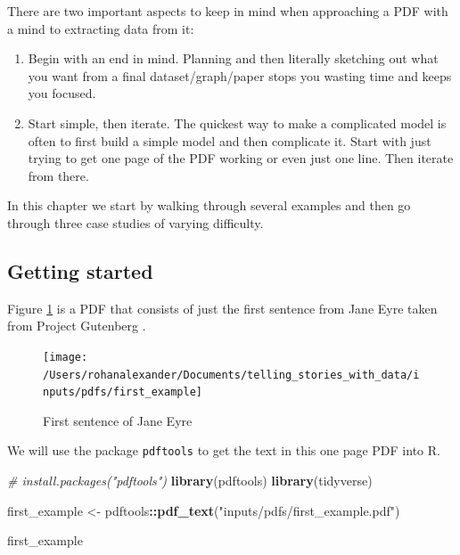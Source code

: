 \documentclass[
]{book}
\newenvironment{Shaded}{\begin{snugshade}}{\end{snugshade}}
\newcommand{\CommentTok}[1]{\textcolor[rgb]{0.56,0.35,0.01}{\textit{#1}}}
\newcommand{\KeywordTok}[1]{\textcolor[rgb]{0.13,0.29,0.53}{\textbf{#1}}}
\newcommand{\NormalTok}[1]{#1}
\newcommand{\OperatorTok}[1]{\textcolor[rgb]{0.81,0.36,0.00}{\textbf{#1}}}
\newcommand{\StringTok}[1]{\textcolor[rgb]{0.31,0.60,0.02}{#1}}
\providecommand{\tightlist}{%
  \setlength{\itemsep}{0pt}\setlength{\parskip}{0pt}}
\begin{document}
There are two important aspects to keep in mind when approaching a PDF with a mind to extracting data from it:

\begin{enumerate}
\def\labelenumi{\arabic{enumi}.}
\tightlist
\item
  Begin with an end in mind. Planning and then literally sketching out what you want from a final dataset/graph/paper stops you wasting time and keeps you focused.
\item
  Start simple, then iterate. The quickest way to make a complicated model is often to first build a simple model and then complicate it. Start with just trying to get one page of the PDF working or even just one line. Then iterate from there.
\end{enumerate}

In this chapter we start by walking through several examples and then go through three case studies of varying difficulty.

\hypertarget{getting-started-4}{%
\subsection{Getting started}\label{getting-started-4}}

Figure \ref{fig:firstpdfexample} is a PDF that consists of just the first sentence from Jane Eyre taken from Project Gutenberg \citet{janeeyre}.

\begin{figure}
\texttt{[image: /Users/rohanalexander/Documents/telling\_stories\_with\_data/inputs/pdfs/first\_example]} \caption{First sentence of Jane Eyre}\label{fig:firstpdfexample}
\end{figure}

We will use the package \texttt{pdftools} \citet{citepdftools} to get the text in this one page PDF into R.

\begin{Shaded}
\begin{Highlighting}[]
\CommentTok{# install.packages("pdftools")}
\KeywordTok{library}\NormalTok{(pdftools)}
\KeywordTok{library}\NormalTok{(tidyverse)}

\NormalTok{first_example <-}\StringTok{ }\NormalTok{pdftools}\OperatorTok{::}\KeywordTok{pdf_text}\NormalTok{(}\StringTok{"inputs/pdfs/first_example.pdf"}\NormalTok{)}

\NormalTok{first_example}
\end{Highlighting}
\end{Shaded}
\end{document}
